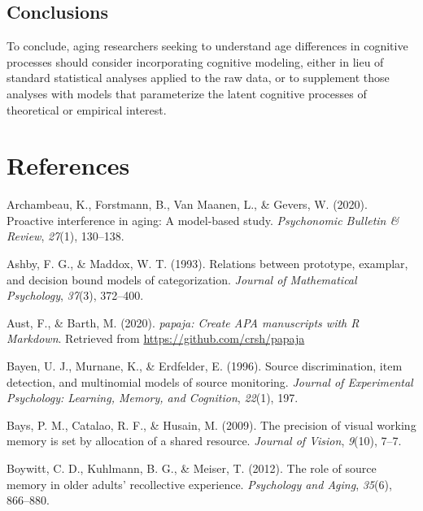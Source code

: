 \documentclass[
  english,
  ,man,floatsintext]{apa6}
\begin{document}
\hypertarget{conclusions}{%
\subsection{Conclusions}\label{conclusions}}

To conclude, aging researchers seeking to understand age differences in cognitive processes should consider incorporating cognitive modeling, either in lieu of standard statistical analyses applied to the raw data, or to supplement those analyses with models that parameterize the latent cognitive processes of theoretical or empirical interest.

\hypertarget{references}{%
\section{References}\label{references}}

\setlength{\parindent}{-0.5in}
\setlength{\leftskip}{0.5in}

\hypertarget{refs}{}
\leavevmode\hypertarget{ref-archambeau2020proactive}{}%
Archambeau, K., Forstmann, B., Van Maanen, L., \& Gevers, W. (2020). Proactive interference in aging: A model-based study. \emph{Psychonomic Bulletin \& Review}, \emph{27}(1), 130--138.

\leavevmode\hypertarget{ref-AshbyAndMaddox1993}{}%
Ashby, F. G., \& Maddox, W. T. (1993). Relations between prototype, examplar, and decision bound models of categorization. \emph{Journal of Mathematical Psychology}, \emph{37}(3), 372--400.

\leavevmode\hypertarget{ref-R-papaja}{}%
Aust, F., \& Barth, M. (2020). \emph{papaja: Create APA manuscripts with R Markdown}. Retrieved from \url{https://github.com/crsh/papaja}

\leavevmode\hypertarget{ref-bayen1996source}{}%
Bayen, U. J., Murnane, K., \& Erdfelder, E. (1996). Source discrimination, item detection, and multinomial models of source monitoring. \emph{Journal of Experimental Psychology: Learning, Memory, and Cognition}, \emph{22}(1), 197.

\leavevmode\hypertarget{ref-bays2009precision}{}%
Bays, P. M., Catalao, R. F., \& Husain, M. (2009). The precision of visual working memory is set by allocation of a shared resource. \emph{Journal of Vision}, \emph{9}(10), 7--7.

\leavevmode\hypertarget{ref-BoywittEtAl2012}{}%
Boywitt, C. D., Kuhlmann, B. G., \& Meiser, T. (2012). The role of source memory in older adults' recollective experience. \emph{Psychology and Aging}, \emph{35}(6), 866--880.
\end{document}
